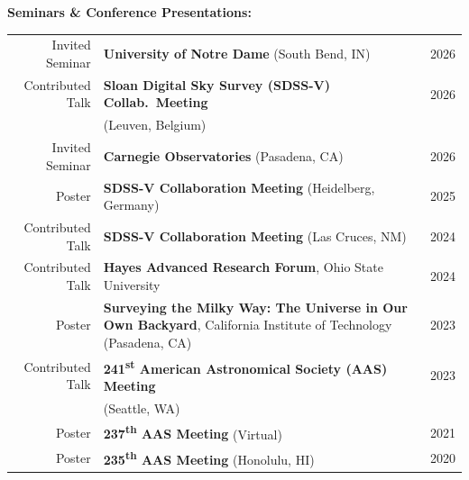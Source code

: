 \vspace{12pt}
\noindent
{\bf Seminars \& Conference Presentations:}

\vspace{-6pt}
\begin{tabularx}{\textwidth}{r X r}
    Invited Seminar     & {\bf University of Notre Dame} (South Bend, IN)   & 2026 \\
    Contributed Talk    & {\bf Sloan Digital Sky Survey (SDSS-V) Collab.\ Meeting}      & 2026 \\
                        & (Leuven, Belgium) \\
    Invited Seminar     & {\bf Carnegie Observatories} (Pasadena, CA)          & 2026 \\
    Poster              & {\bf SDSS-V Collaboration Meeting} (Heidelberg, Germany) & 2025 \\
    Contributed Talk    & {\bf SDSS-V Collaboration Meeting} (Las Cruces, NM) & 2024 \\
    Contributed Talk    & {\bf Hayes Advanced Research Forum}, Ohio State University & 2024 \\
    Poster              & {\bf Surveying the Milky Way: The Universe in Our Own Backyard}, California Institute of Technology (Pasadena, CA) & 2023 \\
    Contributed Talk    & {\bf 241\textsuperscript{st} American Astronomical Society (AAS) Meeting} & 2023 \\
                        & (Seattle, WA) \\
    Poster              & {\bf 237\textsuperscript{th} AAS Meeting} (Virtual) & 2021 \\
    Poster              & {\bf 235\textsuperscript{th} AAS Meeting} (Honolulu, HI) & 2020 \\
    
\end{tabularx}



